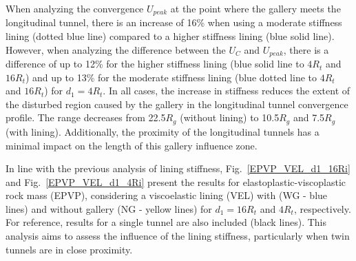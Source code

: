 \documentclass[a4paper,fleqn]{cas-sc}
\begin{document}
When analyzing the convergence $U_{peak}$ at the point where the gallery meets the longitudinal tunnel, there is an increase of 16\% when using a moderate stiffness lining (dotted blue line) compared to a higher stiffness lining (blue solid line). However, when analyzing the difference between the $U_{C}$ and $U_{peak}$, there is a difference of up to 12\% for the higher stiffness lining (blue solid line to $4R_t$ and $16R_t$) and up to 13\% for the moderate stiffness lining (blue dotted line to $4R_t$ and $16R_t$) for $d_1=4R_t$. In all cases, the increase in stiffness reduces the extent of the disturbed region caused by the gallery in the longitudinal tunnel convergence profile. The range decreases from 22.5$R_g$ (without lining) to 10.5$R_g$ and 7.5$R_g$ (with lining). Additionally, the proximity of the longitudinal tunnels has a minimal impact on the length of this gallery influence zone.

In line with the previous analysis of lining stiffness, Fig.~\ref{EPVP_VEL_d1_16Ri} and Fig.~\ref{EPVP_VEL_d1_4Ri} present the results for elastoplastic-viscoplastic rock mass (EPVP), considering a viscoelastic lining (VEL) with (WG - blue lines) and without gallery (NG - yellow lines) for $d_1 = 16R_t$ and $4R_t$, respectively. For reference, results for a single tunnel are also included (black lines). This analysis aims to assess the influence of the lining stiffness, particularly when twin tunnels are in close proximity. 
\end{document}

